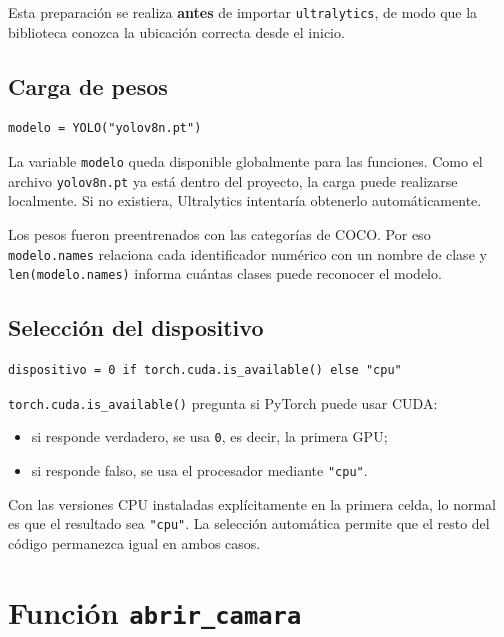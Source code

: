 \documentclass[11pt,a4paper]{article}
\newcommand{\archivo}[1]{\nolinkurl{#1}}
\begin{document}
Esta preparación se realiza \textbf{antes} de importar
\texttt{ultralytics}, de modo que la biblioteca conozca la ubicación correcta
desde el inicio.

\subsection{Carga de pesos}

\begin{lstlisting}
modelo = YOLO("yolov8n.pt")
\end{lstlisting}

La variable \texttt{modelo} queda disponible globalmente para las funciones.
Como el archivo \archivo{yolov8n.pt} ya está dentro del proyecto, la carga
puede realizarse localmente. Si no existiera, Ultralytics intentaría obtenerlo
automáticamente.

Los pesos fueron preentrenados con las categorías de COCO. Por eso
\texttt{modelo.names} relaciona cada identificador numérico con un nombre de
clase y \texttt{len(modelo.names)} informa cuántas clases puede reconocer el
modelo.

\subsection{Selección del dispositivo}

\begin{lstlisting}
dispositivo = 0 if torch.cuda.is_available() else "cpu"
\end{lstlisting}

\texttt{torch.cuda.is\_available()} pregunta si PyTorch puede usar CUDA:

\begin{itemize}
  \item si responde verdadero, se usa \texttt{0}, es decir, la primera GPU;
  \item si responde falso, se usa el procesador mediante \texttt{"cpu"}.
\end{itemize}

Con las versiones CPU instaladas explícitamente en la primera celda, lo normal
es que el resultado sea \texttt{"cpu"}. La selección automática permite que
el resto del código permanezca igual en ambos casos.

\section{Función \texttt{abrir\_camara}}
\end{document}
